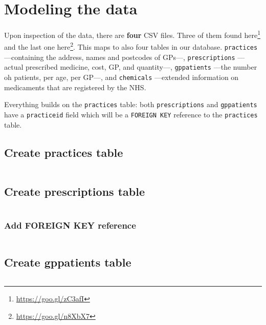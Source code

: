 \documentclass[english,a4paper,]{report}
\renewcommand{\href}[2]{#2\footnote{\url{#1}}}
\begin{document}
\section{Modeling the data}\label{modeling-the-data}

Upon inspection of the data, there are \textbf{four} CSV files. Three of
them found \href{https://goo.gl/zC3afI}{here} and the last one
\href{https://goo.gl/n8XbX7}{here}. This maps to also four tables in our
database. \texttt{practices} ---containing the address, names and
postcodes of GPs---, \texttt{prescriptions} ---actual prescribed
medicine, cost, GP, and quantity---, \texttt{gppatients} ---the number
oh patients, per age, per GP---, and \texttt{chemicals} ---extended
information on medicaments that are registered by the NHS.

Everything builds on the \texttt{practices} table: both
\texttt{prescriptions} and \texttt{gppatients} have a
\texttt{practiceid} field which will be a \texttt{FOREIGN\ KEY}
reference to the \texttt{practices} table.

\subsection{Create practices table}\label{create-practices-table}

\inputminted[firstline=10,lastline=19]{sql}{src/sql/00-setup.sql}

\subsection{Create prescriptions
table}\label{create-prescriptions-table}

\inputminted[firstline=21,lastline=34]{sql}{src/sql/00-setup.sql}

\subsubsection{Add FOREIGN KEY
reference}\label{add-foreign-key-reference}

\inputminted[firstline=36,lastline=36]{sql}{src/sql/00-setup.sql}

\subsection{Create gppatients table}\label{create-gppatients-table}

\inputminted[firstline=43,lastline=46]{sql}{src/sql/00-setup.sql}
\end{document}

